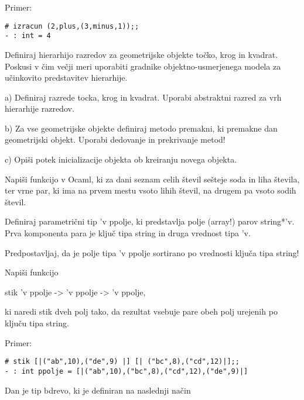 \begin{ex}
Primer:

\begin{verbatim}
# izracun (2,plus,(3,minus,1));;
- : int = 4

\end{verbatim} 

\end{ex} \begin{ex}
Definiraj hierarhijo razredov za geometrijske objekte to\v cko, krog in kvadrat. Poskusi v \v cim ve\v cji meri uporabiti gradnike objektno-usmerjenega modela za u\v cinkovito predstavitev hierarhije. 

a) Definiraj razrede tocka, krog in kvadrat. Uporabi abstraktni razred za vrh hierarhije razredov.

b) Za vse geometrijske objekte definiraj metodo premakni, ki premakne dan geometrijski objekt. Uporabi dedovanje in prekrivanje metod!

c) Opi\v si potek inicializacije objekta ob kreiranju novega objekta.

\end{ex} \begin{ex}
Napi\v si funkcijo v Ocaml, ki za dani seznam celih \v stevil se\v steje soda in liha \v stevila, ter vrne par, ki ima na prvem mestu vsoto lihih \v stevil, na drugem pa vsoto sodih \v stevil.


\end{ex} \begin{ex}
Definiraj parametri\v cni tip 'v ppolje, ki predstavlja polje (array!) parov string*'v. Prva komponenta para je klju\v c tipa string in druga vrednost tipa 'v. 

Predpostavljaj, da je polje tipa 'v ppolje sortirano po vrednosti klju\v ca tipa string!  

Napi\v si funkcijo

stik 'v ppolje -> 'v ppolje -> 'v ppolje, 

ki naredi stik dveh polj tako, da rezultat vsebuje pare obeh polj urejenih po klju\v cu tipa string. 


Primer:

\begin{verbatim}
# stik [|("ab",10),("de",9) |] [| ("bc",8),("cd",12)|];;
- : int ppolje = [|("ab",10),("bc",8),("cd",12),("de",9)|]

\end{verbatim}

\end{ex} \begin{ex}
Dan je tip bdrevo, ki je definiran na naslednji na\v cin


\end{ex}
